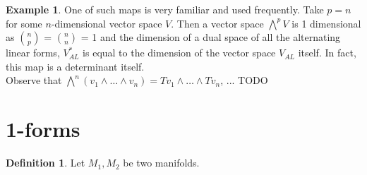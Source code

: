 \documentclass[a4paper, 11pt]{article}
\theoremstyle{definition}
\newtheorem{definition}{Definition}[section]
\newtheorem{example}{Example}[section]
\begin{document}
\begin{example}
One of such maps is very familiar and used frequently. Take $p = n$ for some $n$-dimensional vector space $V$. Then a vector space $\bigwedge^pV$ is 1 dimensional as ${n}\choose{p}$ = ${n}\choose{n}$ = 1 and the dimension of a dual space of all the alternating linear forms, $V^*_{AL}$ is equal to the dimension of the vector space $V_{AL}$ itself.
In fact, this map is a determinant itself. \\
Observe that $\bigwedge^n(v_1 \wedge \dots \wedge v_n) = T v_1 \wedge \dots \wedge Tv_n$, ... TODO
\end{example}

\section{1-forms}
\begin{definition}
Let $M_1, M_2$ be two manifolds. 
\end{definition}

%
\end{document}
